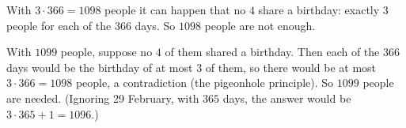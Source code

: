 With $3\cdot366=1098$ people it can happen that no $4$ share a birthday: exactly $3$ people for each of the $366$ days. So $1098$ people are not enough.

With $1099$ people, suppose no $4$ of them shared a birthday. Then each of the $366$ days would be the birthday of at most $3$ of them, so there would be at most $3\cdot366=1098$ people, a contradiction (the pigeonhole principle). So $\boxed{1099}$ people are needed. (Ignoring 29 February, with $365$ days, the answer would be $3\cdot365+1=1096$.)
